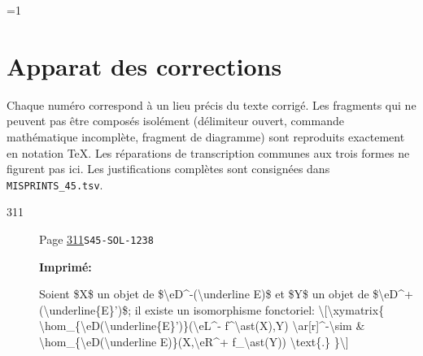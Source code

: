 \documentclass[oneside]{book}
\theoremstyle{sga-source}
\theoremstyle{sga-source-dash}
\theoremstyle{sga-source-dotdash}
\theoremstyle{sga-source-number-note-dash}
\theoremstyle{sga-source-note-number-dotdash}
\theoremstyle{sga-source-example-dotdash}
\theoremstyle{sga-source-inline-number}
\theoremstyle{sga-source-bare-number}
\theoremstyle{sga-source}
\providecommand\EditionMode{1}
\begin{document}
\ifnum\EditionMode=1\relax
\clearpage
\chapter*{Apparat des corrections}
Chaque numéro correspond à un lieu précis du texte corrigé. Les fragments qui ne peuvent pas être composés isolément (délimiteur ouvert, commande mathématique incomplète, fragment de diagramme) sont reproduits exactement en notation TeX. Les réparations de transcription communes aux trois formes ne figurent pas ici. Les justifications complètes sont consignées dans \texttt{MISPRINTS\_45.tsv}.
\begingroup\small
\begin{description}
\item[\hypertarget{apparatus:FR-0311}{311}] Page \hyperlink{printpage:fr:311}{311}\quad\texttt{S45-SOL-1238}
\par\noindent\textbf{Imprimé:} {\footnotesize\ttfamily\raggedright Soient \$X\$ un objet de \$\textbackslash{}\allowbreak{}eD\textasciicircum{}\allowbreak{}-\allowbreak{}(\allowbreak{}\textbackslash{}\allowbreak{}underline E)\allowbreak{}\$ et \$Y\$ un objet de  \$\textbackslash{}\allowbreak{}eD\textasciicircum{}\allowbreak{}+\allowbreak{}(\allowbreak{}\textbackslash{}\allowbreak{}underline\{\allowbreak{}E\}\allowbreak{}')\allowbreak{}\$; il existe un isomorphisme fonctoriel:  \textbackslash{}\allowbreak{}[\allowbreak{}\textbackslash{}\allowbreak{}xymatrix\{\allowbreak{}   \textbackslash{}\allowbreak{}hom\_\allowbreak{}\{\allowbreak{}\textbackslash{}\allowbreak{}eD(\allowbreak{}\textbackslash{}\allowbreak{}underline\{\allowbreak{}E\}\allowbreak{}')\allowbreak{}\}\allowbreak{}(\allowbreak{}\textbackslash{}\allowbreak{}eL\textasciicircum{}\allowbreak{}-\allowbreak{} f\textasciicircum{}\allowbreak{}\textbackslash{}\allowbreak{}ast(\allowbreak{}X)\allowbreak{},\allowbreak{}Y)\allowbreak{} \textbackslash{}\allowbreak{}ar[\allowbreak{}r]\allowbreak{}\textasciicircum{}\allowbreak{}-\allowbreak{}\textbackslash{}\allowbreak{}sim      \& \textbackslash{}\allowbreak{}hom\_\allowbreak{}\{\allowbreak{}\textbackslash{}\allowbreak{}eD(\allowbreak{}\textbackslash{}\allowbreak{}underline E)\allowbreak{}\}\allowbreak{}(\allowbreak{}X,\allowbreak{}\textbackslash{}\allowbreak{}eR\textasciicircum{}\allowbreak{}+\allowbreak{} f\_\allowbreak{}\textbackslash{}\allowbreak{}ast(\allowbreak{}Y)\allowbreak{})\allowbreak{} \textbackslash{}\allowbreak{}text\{\allowbreak{}.\}\allowbreak{} \}\allowbreak{}\textbackslash{}\allowbreak{}]\allowbreak{}\par}

\end{description}
\end{document}
